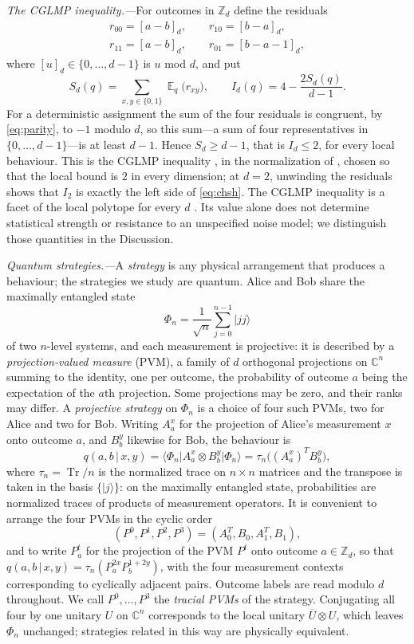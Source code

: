 \documentclass[aps,prl,reprint,superscriptaddress,longbibliography,floatfix,raggedbottom]{revtex4-2}
\newcommand{\C}{\mathbb C}
\newcommand{\Z}{\mathbb Z}
\newcommand{\ket}[1]{\lvert #1\rangle}
\newcommand{\bra}[1]{\langle #1\rvert}
\DeclareMathOperator{\Tr}{Tr}
\DeclareMathOperator{\Ex}{\mathbb E}
\newcommand{\tr}{\tau}
\begin{document}
\emph{The CGLMP inequality.---}For outcomes in $\Z_d$ define the residuals
\[
\begin{gathered}
r_{00}=[a-b]_d,\qquad r_{10}=[b-a]_d,\\
r_{11}=[a-b]_d,\qquad r_{01}=[b-a-1]_d,
\end{gathered}
\]
where $[u]_d\in\{0,\dots,d-1\}$ is $u$ mod $d$,
and put
\begin{equation}\label{eq:Id}
S_d(q)=\sum_{x,y\in\{0,1\}}\Ex_q\bigl(r_{xy}\bigr),\qquad
I_d(q)=4-\frac{2S_d(q)}{d-1}.
\end{equation}
For a deterministic assignment the sum of the four residuals is congruent,
by \eqref{eq:parity}, to $-1$ modulo $d$, so this sum---a sum of four
representatives in $\{0,\dots,d-1\}$---is at least $d-1$. Hence
$S_d\ge d-1$, that is $I_d\le2$, for every local behaviour. This is
the CGLMP inequality \cite{CGLMP}, in the normalization of \cite{AGG},
chosen so that the local bound is $2$ in every dimension; at $d=2$,
unwinding the residuals shows that $I_2$ is exactly the left side of
\eqref{eq:chsh}. The CGLMP inequality is a facet of the local polytope for every $d$
\cite{Masanes}. Its value alone does not determine statistical strength
or resistance to an unspecified noise model; we distinguish those
quantities in the Discussion.

\emph{Quantum strategies.---}A \emph{strategy} is any physical
arrangement that produces a behaviour; the strategies we study are
quantum. Alice and Bob share the maximally entangled state
\[
\Phi_n=\frac1{\sqrt n}\sum_{j=0}^{n-1}\ket{jj}
\]
of two $n$-level systems, and each measurement is projective: it is
described by a \emph{projection-valued measure} (PVM), a family of $d$
orthogonal projections on $\C^n$ summing to the identity, one per
outcome, the probability of outcome $a$ being the expectation of the
$a$th projection. Some projections may be zero, and their ranks may
differ. A \emph{projective strategy} on $\Phi_n$ is a choice of four
such PVMs, two for Alice and two for Bob. Writing $A^x_a$
for the projection of Alice's measurement $x$ onto outcome $a$, and
$B^y_b$ likewise for Bob, the behaviour is
\[
q(a,b\,|\,x,y)=\bra{\Phi_n}A^x_a\otimes B^y_b\ket{\Phi_n}
=\tr_n\bigl((A^x_a)^{T}B^y_b\bigr),
\]
where $\tr_n=\Tr/n$ is the normalized trace on $n\times n$ matrices
and the transpose is taken in the basis $\{\ket j\}$: on the maximally
entangled state, probabilities are normalized traces of products of
measurement operators. It is convenient to arrange the four PVMs in
the cyclic order
\begin{equation}\label{eq:tracial}
(P^0,P^1,P^2,P^3)=(A_0^{T},B_0,A_1^{T},B_1),
\end{equation}
and to write $P^t_a$ for the projection of the PVM $P^t$ onto outcome
$a\in\Z_d$, so that $q(a,b\,|\,x,y)=\tr_n(P^{2x}_aP^{1+2y}_b)$, with
the four measurement contexts corresponding to cyclically adjacent
pairs. Outcome labels are read modulo $d$ throughout. We call
$P^0,\dots,P^3$ the \emph{tracial PVMs} of the strategy.
Conjugating all four by one unitary $U$ on $\C^n$ corresponds to the
local unitary $\overline U\otimes U$, which leaves $\Phi_n$ unchanged;
strategies related in this way are physically equivalent.
\end{document}

